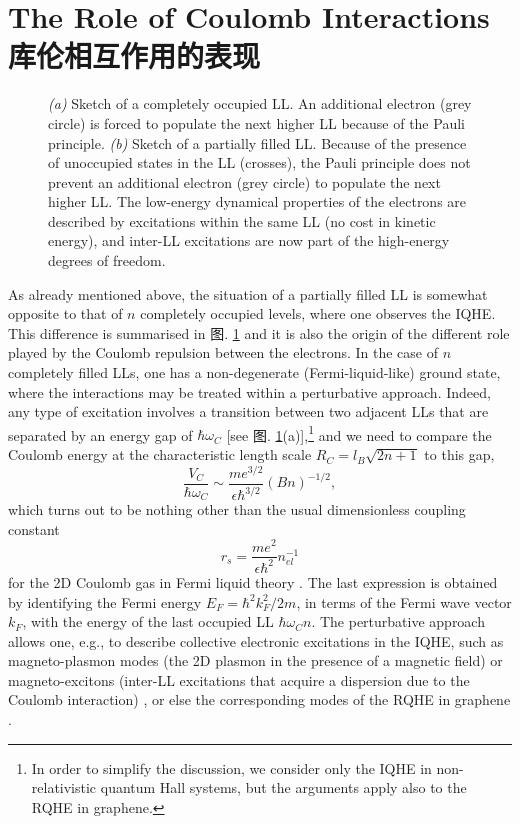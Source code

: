 \documentclass[10pt]{book}
\begin{document}
\section[库伦相互作用的效应]{The Role of Coulomb Interactions\\\bf 库伦相互作用的表现}
\label{Coul}





\begin{figure}
\begin{center}
\end{center}
\caption{ {\sl (a)} Sketch of a completely occupied LL. An additional electron (grey circle) is forced to populate the next higher
LL because of the Pauli principle. 
{\sl (b)} Sketch of a partially filled LL. Because of the presence of unoccupied states in the LL (crosses), the Pauli principle 
does not prevent an additional electron (grey circle) to populate the next higher LL. The low-energy dynamical properties of
the electrons are described by excitations within the same LL (no cost in kinetic energy), and inter-LL excitations are now
part of the high-energy degrees of freedom.}
\label{fig19}
\end{figure}

As already mentioned above, the situation of a partially filled LL is somewhat opposite to that of $n$ completely occupied
levels, where one observes the IQHE. This difference is summarised in 图. \ref{fig19} and it is also the origin of the 
different role played by the Coulomb repulsion between the electrons. In the case of $n$ completely filled
LLs, one has a non-degenerate (Fermi-liquid-like) ground state, where the interactions may be treated within a perturbative
approach. Indeed, any type of excitation involves a transition between two adjacent LLs that are separated by an energy
gap of $\hbar\omega_C$ [see 图. \ref{fig19}(a)],\footnote{In order to simplify the discussion, 
we consider only the IQHE in non-relativistic quantum
Hall systems, but the arguments apply also to the RQHE in graphene.}
and we need to compare the Coulomb energy at the characteristic length scale $R_C=l_B\sqrt{2n+1}$ 
to this gap,
$$
\frac{V_C}{\hbar \omega_C}\sim \frac{m e^{3/2}}{\epsilon \hbar^{3/2}}(Bn)^{-1/2},
$$
which turns out to be nothing other than the usual dimensionless coupling constant
$$r_s=\frac{me^2}{\epsilon \hbar^2}n_{el}^{-1}
$$
for the 2D Coulomb gas in Fermi liquid theory \cite{mahan,GV}. 
The last expression is obtained by identifying the Fermi energy $E_F=\hbar^2k_F^2/2m$, in terms
of the Fermi wave vector $k_F$, with the energy of the last occupied LL $\hbar\omega_C n$.
The perturbative approach allows one, e.g., to describe collective electronic excitations in the IQHE, such as magneto-plasmon
modes (the 2D plasmon in the presence of a magnetic field) or magneto-excitons (inter-LL excitations that acquire a dispersion
due to the Coulomb interaction) \cite{KH}, or else the corresponding modes of the RQHE in graphene \cite{iyengar,RFG}.
\end{document}
